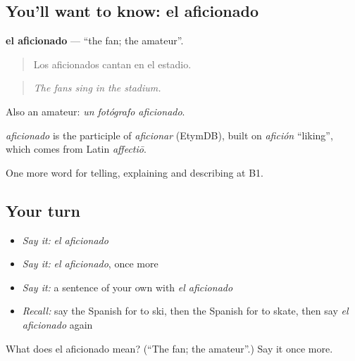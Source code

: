\subsection*{You'll want to know: el aficionado}
\textbf{el aficionado} — \textquotedblleft{}the fan; the amateur\textquotedblright{}.

\begin{quote}
Los aficionados cantan en el estadio.
\end{quote}

\begin{quote}
\emph{The fans sing in the stadium.}
\end{quote}

Also an amateur: \emph{un fotógrafo aficionado}.

\begin{cousinweb}
\emph{aficionado} is the participle of \emph{aficionar} (EtymDB), built on \emph{afición} \textquotedblleft{}liking\textquotedblright{}, which comes from Latin \emph{affectiō}.
\end{cousinweb}

\begin{grammarlens}[title={What you've built}]
One more word for telling, explaining and describing at B1.
\end{grammarlens}

\subsection*{Your turn}
\begin{itemize}
\raggedright
  \item \emph{Say it:} \emph{el aficionado}
  \item \emph{Say it:} \emph{el aficionado}, once more
  \item \emph{Say it:} a sentence of your own with \emph{el aficionado}
  \item \emph{Recall:} say the Spanish for to ski, then the Spanish for to skate, then say \emph{el aficionado} again
\end{itemize}

\begin{tcolorbox}[breakable,colback=teal!4,colframe=teal!35!black,title={Before you move on}]
What does el aficionado mean? (\textquotedblleft{}The fan; the amateur\textquotedblright{}.) Say it once more.
\end{tcolorbox}
